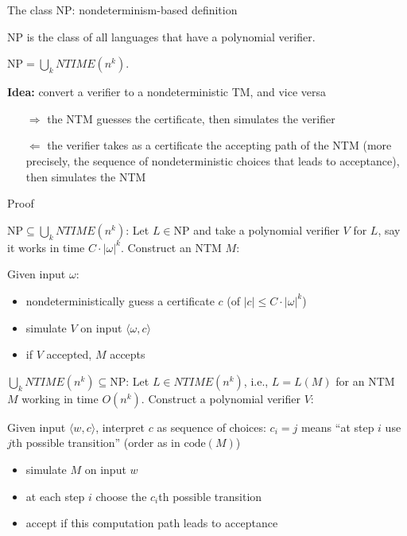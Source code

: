 \documentclass[handout]{beamer}
\begin{document}
\begin{frame}{The class NP: nondeterminism-based definition}
    
    \begin{definition}
        $\mathrm{NP}$ is the class of all languages that have a polynomial verifier.
    \end{definition}
    \begin{theorem}
    $\mathrm{NP}=\bigcup_k NTIME(n^k)$.
    \end{theorem}

    \textbf{Idea:} convert a verifier to a nondeterministic TM, and vice versa
    \begin{itemize}
        \item[$\Rightarrow$] the NTM guesses the certificate, then simulates the verifier
        \item[$\Leftarrow$] the verifier takes as a certificate the accepting path of the NTM (more precisely, the sequence of nondeterministic choices that leads to acceptance), then simulates the NTM
    \end{itemize}

\end{frame}
    
\begin{frame}{Proof}
    
    \alert{$\mathrm{NP}\subseteq\bigcup_k NTIME(n^k)$:} Let $L\in\mathrm{NP}$ and take a polynomial verifier $V$ for $L$, say it works in time $C\cdot |\omega|^k$. Construct an NTM $M$:

    Given input $\omega$:
    
    \vspace{-3pt}
    \begin{itemize}
        \item nondeterministically guess a certificate $c$ (of $|c|\leq C\cdot |\omega|^k$)
        \item simulate $V$ on input $\langle \omega, c\rangle$
        \item if $V$ accepted, $M$ accepts
    \end{itemize}
        
    \alert{$\bigcup_k NTIME(n^k)\subseteq\mathrm{NP}$:} Let $L\in NTIME(n^k)$, i.e., $L=L(M)$ for an NTM $M$ working in time $O(n^k)$. Construct a polynomial verifier $V$:

    Given input $\langle w, c\rangle$, interpret $c$ as sequence of choices: $c_i=j$ means ``at step $i$ use $j$th possible transition'' (order as in $\mathrm{code}(M)$)
 
    \vspace{-3pt}
    \begin{itemize}        
        \item simulate $M$ on input $w$
        \item at each step $i$ choose the $c_i$th possible transition
        \item accept if this computation path leads to acceptance\hfill\qedsymbol     
    \end{itemize}    

\end{frame}
\end{document}
